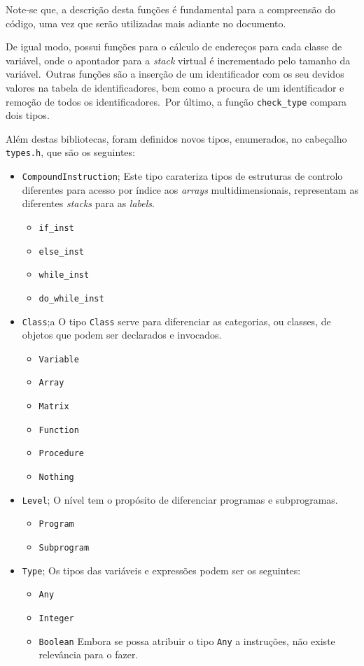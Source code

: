 Note-se que, a descrição desta funções é fundamental para a compreensão do
código, uma vez que serão utilizadas mais adiante no documento.

De igual modo, possui funções para o cálculo de endereços para cada classe de
variável, onde o apontador para a \emph{stack} virtual é incrementado pelo
tamanho da variável.\ Outras funções são a inserção de um identificador com os
seu devidos valores na tabela de identificadores, bem como a procura de um
identificador e remoção de todos os identificadores.\ Por último, a função
\texttt{check\_type} compara dois tipos.\  

Além destas bibliotecas, foram definidos novos tipos, enumerados,  no cabeçalho
\texttt{types.h}, que são os seguintes:


\begin{itemize}
	\item \verb|CompoundInstruction|;
Este tipo carateriza tipos de estruturas de controlo diferentes para acesso por
índice aos \emph{arrays} multidimensionais, representam as diferentes
\emph{stacks} para as \emph{labels}.   

		\begin{itemize}
			\item \texttt{if\_inst}
			\item \texttt{else\_inst}
			\item \texttt{while\_inst}
			\item \texttt{do\_while\_inst}
		\end{itemize}
	\item \verb|Class|;a
		O tipo \texttt{Class} serve para diferenciar as categorias, ou classes, de
		objetos que podem ser declarados e invocados.
		\begin{itemize}
			\item \texttt{Variable}
			\item \texttt{Array}
			\item \texttt{Matrix}
			\item \texttt{Function}
			\item \texttt{Procedure}
			\item \texttt{Nothing}
		\end{itemize}
	\item \verb|Level|;
		O nível tem o propósito de diferenciar programas e subprogramas.
		\begin{itemize}
			\item \texttt{Program}
			\item \texttt{Subprogram}
		\end{itemize}
	\item \verb|Type|;
		Os tipos das variáveis e expressões podem ser os seguintes:
		\begin{itemize}
			\item \texttt{Any}
			\item \texttt{Integer}
			\item \texttt{Boolean}
				Embora se possa atribuir o tipo \texttt{Any} a instruções, não existe
				relevância para o fazer. 
		\end{itemize}
\end{itemize}


